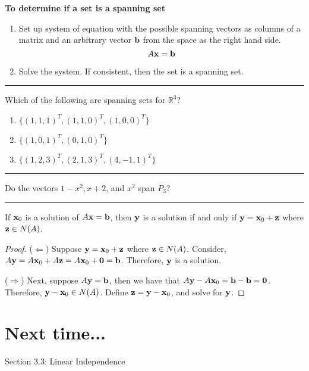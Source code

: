 \textbf{To determine if a set is a spanning set}
\begin{enumerate}
	\item Set up system of equation with the possible spanning vectors as columns of a matrix and an arbitrary vector $ {\bf b}$ from the space as the right hand side.  
	\[ A {\bf x} = {\bf b} \]
	\item Solve the system.  If consistent, then the set is a spanning set.
\end{enumerate}

 \rule[0.01in]{\textwidth}{0.0025in}




 \begin{example}
 Which of the following are spanning sets for $\mathbb{R}^3$?
 \begin{enumerate}
 	\item $\{ (1, 1, 1)^T, (1, 1, 0)^T, (1, 0, 0)^T \}$
	\item $\{ (1, 0, 1)^T, (0, 1, 0)^T \}$
	\item $\{(1, 2, 3)^T, (2, 1, 3)^T, (4, -1, 1)^T \}$
 \end{enumerate}
 \end{example}

 \rule[0.01in]{\textwidth}{0.0025in}


\begin{example}
	Do the vectors $1 - x^2, x+2$, and $x^2$ span $P_3$?
\end{example}

 \rule[0.01in]{\textwidth}{0.0025in}





\begin{theorem}
	If ${\bf x}_0$ is a solution of  $A {\bf x} = {\bf b}$, then ${\bf y}$ is a solution if and only if ${\bf y} = {\bf x}_0 + {\bf z}$ where ${\bf z} \in N(A)$.
	
	\begin{proof}
	($ \Leftarrow$) Suppose ${\bf y} = {\bf x}_0 + {\bf z}$ where ${\bf z} \in N(A)$.  Consider, 
	$ A {\bf y} = A {\bf x}_0 + A {\bf z} = A {\bf x}_0 + {\bf 0} = {\bf b}$.  Therefore, ${\bf y}$ is a solution.
	
	($ \Rightarrow$) Next, suppose $ A {\bf y} =  {\bf b}$, then we have that $A {\bf y}  - A {\bf x}_0 = {\bf b} -  {\bf b}  = {\bf 0}$.  Therefore, ${\bf y}  - {\bf x}_0 \in N(A)$.  Define ${\bf z } = {\bf y} - {\bf x}_0$, and solve for ${\bf y}$.        
	\end{proof}
\end{theorem}




\section*{Next time...}
Section 3.3: Linear Independence

